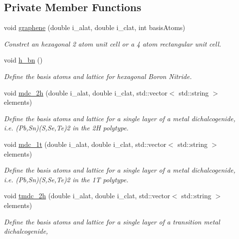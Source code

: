 \subsection*{Private Member Functions}
\begin{DoxyCompactItemize}
\item 
void \hyperlink{class_structure_lib_ac4e830377b5c9b60761deb8feb00dbce}{graphene} (double i\+\_\+alat, double i\+\_\+clat, int basis\+Atoms)
\begin{DoxyCompactList}\small\item\em Constrct an hexagonal 2 atom unit cell or a 4 atom rectangular unit cell. \end{DoxyCompactList}\item 
void \hyperlink{class_structure_lib_a0b668498d5600cc7ec3da71f0b7cc9a4}{h\+\_\+bn} ()
\begin{DoxyCompactList}\small\item\em Define the basis atoms and lattice for hexagonal Boron Nitride. \end{DoxyCompactList}\item 
void \hyperlink{class_structure_lib_a08e109e6475bf16b14041341e05de271}{mdc\+\_\+2h} (double i\+\_\+alat, double i\+\_\+clat, std\+::vector$<$ std\+::string $>$ elements)
\begin{DoxyCompactList}\small\item\em Define the basis atoms and lattice for a single layer of a metal dichalcogenide, ~\newline
 i.\+e. (Pb,Sn)(S,Se,Te)2 in the 2\+H polytype. \end{DoxyCompactList}\item 
void \hyperlink{class_structure_lib_afff80bb07d6158b69483c510c3ac4007}{mdc\+\_\+1t} (double i\+\_\+alat, double i\+\_\+clat, std\+::vector$<$ std\+::string $>$ elements)
\begin{DoxyCompactList}\small\item\em Define the basis atoms and lattice for a single layer of a metal dichalcogenide, ~\newline
 i.\+e. (Pb,Sn)(S,Se,Te)2 in the 1\+T polytype. \end{DoxyCompactList}\item 
void \hyperlink{class_structure_lib_a2cc027e92840c3a04ecb84330cd79030}{tmdc\+\_\+2h} (double i\+\_\+alat, double i\+\_\+clat, std\+::vector$<$ std\+::string $>$ elements)
\begin{DoxyCompactList}\small\item\em Define the basis atoms and lattice for a single layer of a transition metal dichalcogenide, ~\newline

\end{DoxyCompactList}
\end{DoxyCompactItemize}
